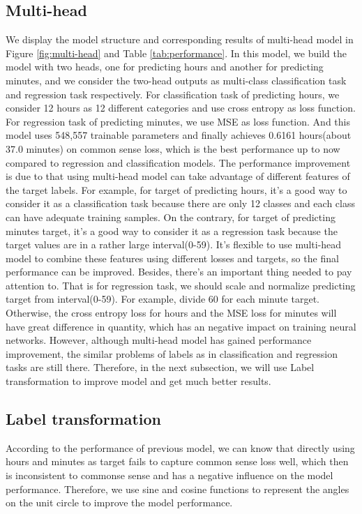 \documentclass{article}
\begin{document}
\subsection{Multi-head}
We display the model structure and corresponding results of multi-head model in Figure \ref{fig:multi-head} and Table \ref{tab:performance}. In this model, we build the model with two heads, one for predicting hours and another for predicting minutes, and we consider the two-head outputs as multi-class classification task and regression task respectively. For classification task of predicting hours, we consider 12 hours as 12 different categories and use cross entropy as loss function. For regression task of predicting minutes, we use MSE as loss function. And this model uses 548,557 trainable parameters and finally achieves 0.6161 hours(about 37.0 minutes) on common sense loss, which is the best performance up to now compared to regression and classification models. The performance improvement is due to that using multi-head model can take advantage of different features of the target labels. For example, for target of predicting hours, it's a good way to consider it as a classification task because there are only 12 classes and each class can have adequate training samples. On the contrary, for target of predicting minutes target, it's a good way to consider it as a regression task because the target values are in a rather large interval(0-59). It's flexible to use multi-head model to combine these features using different losses and targets, so the final performance can be improved. Besides, there's an important thing needed to pay attention to. That is for regression task, we should scale and normalize predicting target from interval(0-59). For example, divide 60 for each minute target. Otherwise, the cross entropy loss for hours and the MSE loss for minutes will have great difference in quantity, which has an negative impact on training neural networks. However, although multi-head model has gained performance improvement, the similar problems of labels as in classification and regression tasks are still there. Therefore, in the next subsection, we will use Label transformation to improve model and get much better results.


\subsection{Label transformation}
According to the performance of previous model, we can know that directly using hours and minutes as target fails to capture common sense loss well, which then is inconsistent to commonse sense and has a negative influence on the model performance. Therefore, we use sine and cosine functions to represent the angles on the unit circle to improve the model performance.
\end{document}
